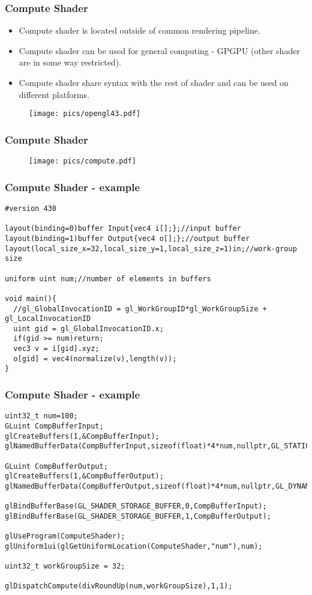 \begin{frame}
\frametitle{Compute Shader}
	\begin{itemize}
	\item Compute shader is located outside of common rendering pipeline.
  \item Compute shader can be used for general computing - GPGPU (other shader are in some way restricted).
  \item Compute shader share syntax with the rest of shader and can be used on different platforms.
	\end{itemize}
	\begin{figure}[h]
	\texttt{[image: pics/opengl43.pdf]}
	\end{figure}
\end{frame}

\begin{frame}
\frametitle{Compute Shader}
	\begin{figure}[h]
	\texttt{[image: pics/compute.pdf]}
	\end{figure}
\end{frame}

\begin{frame}[fragile]
\frametitle{Compute Shader - example}
	{\scriptsize
	\begin{verbatim}
#version 430

layout(binding=0)buffer Input{vec4 i[];};//input buffer
layout(binding=1)buffer Output{vec4 o[];};//output buffer
layout(local_size_x=32,local_size_y=1,local_size_z=1)in;//work-group size

uniform uint num;//number of elements in buffers

void main(){
  //gl_GlobalInvocationID = gl_WorkGroupID*gl_WorkGroupSize + gl_LocalInvocationID	
  uint gid = gl_GlobalInvocationID.x;
  if(gid >= num)return;
  vec3 v = i[gid].xyz;
  o[gid] = vec4(normalize(v),length(v));
}
	\end{verbatim}
	}
\end{frame}

\begin{frame}[fragile]
\frametitle{Compute Shader - example}
	{\scriptsize
	\begin{verbatim}
uint32_t num=100;
GLuint CompBufferInput;
glCreateBuffers(1,&CompBufferInput);
glNamedBufferData(CompBufferInput,sizeof(float)*4*num,nullptr,GL_STATIC_DRAW);

GLuint CompBufferOutput;
glCreateBuffers(1,&CompBufferOutput);
glNamedBufferData(CompBufferOutput,sizeof(float)*4*num,nullptr,GL_DYNAMIC_COPY);

glBindBufferBase(GL_SHADER_STORAGE_BUFFER,0,CompBufferInput);
glBindBufferBase(GL_SHADER_STORAGE_BUFFER,1,CompBufferOutput);

glUseProgram(ComputeShader);
glUniform1ui(glGetUniformLocation(ComputeShader,"num"),num);

uint32_t workGroupSize = 32;

glDispatchCompute(divRoundUp(num,workGroupSize),1,1);
	\end{verbatim}
	}
\end{frame}

